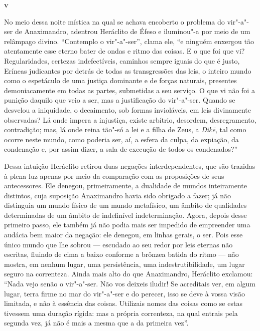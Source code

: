 \bigskip
\textsc{\textbf{v}}
\bigskip

No meio dessa noite mística na qual se achava encoberto o problema do \label{noitemistica} 
vir"-a"-ser de Anaximandro, adentrou Heráclito de Éfeso e iluminou"-a por meio 
de um relâmpago divino. ``Contemplo o vir"-a"-ser'', clama ele, ``e ninguém 
enxergou tão atentamente esse eterno bater de ondas e ritmo das coisas. E o que 
foi que vi? Regularidades, certezas indefectíveis, caminhos sempre iguais do que 
é justo, Eríneas judicantes por detrás de todas as transgressões das leis, o inteiro 
mundo como o espetáculo de uma justiça dominante e de forças naturais, presentes 
demoniacamente em todas as partes, submetidas a seu serviço. O que vi não foi a punição 
daquilo que veio a ser, mas a justificação do vir"-a"-ser. Quando se desvelou a iniquidade, o
decaimento, sob formas invioláveis, em leis divinamente observadas? Lá onde
impera a injustiça, existe arbítrio, desordem, desregramento, contradição;
mas, lá onde reina tão"-só a lei e a filha de Zeus, a \textit{Dik\=e}, tal 
como ocorre neste mundo, como poderia ser, aí, a esfera  da culpa, da expiação, 
da condenação e, por assim dizer, a sala de execução de todos os condenados?''

Dessa intuição Heráclito retirou duas negações interdependentes, que são
trazidas à plena luz apenas por meio da comparação com as proposições de seus
antecessores. Ele denegou, primeiramente, a dualidade de mundos inteiramente
distintos, cuja suposição Anaximandro havia sido obrigado a fazer; já não
distinguia um mundo físico de um mundo metafísico, um âmbito de qualidades
determinadas de um âmbito de indefinível indeterminação. Agora, depois desse
primeiro passo, ele também já não podia mais ser impedido de empreender uma
audácia bem maior da negação: ele denegou, em linhas gerais, o ser. Pois esse
único mundo que lhe \label{esseunicomundo} sobrou --- escudado ao seu redor
por leis eternas não escritas, fluindo de cima a baixo conforme a brônzea
batida do ritmo --- não mostra, em nenhum lugar, uma persistência, uma
indestrutibilidade, um lugar seguro na correnteza. Ainda mais alto do que
Anaximandro, Heráclito exclamou: ``Nada vejo senão o vir"-a"-ser. Não vos
deixeis iludir! Se acreditais ver, em algum lugar, terra firme no mar do
vir"-a"-ser e do perecer, isso se deve à vossa visão limitada, e não à
essência das coisas. Utilizais nomes das coisas como se estas tivessem uma
duração rígida: mas a própria correnteza, na qual entrais pela segunda vez,
já não é mais a mesma que a da primeira vez''.

